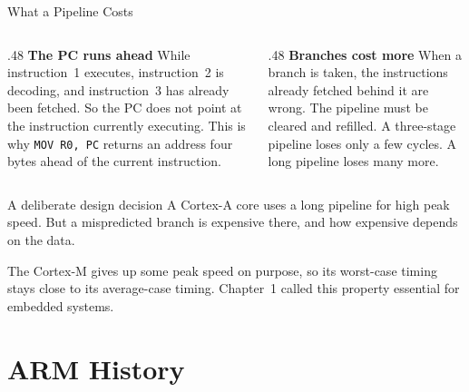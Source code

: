 \documentclass[9pt,aspectratio=169,xcolor=table]{beamer}
\begin{document}
\begin{frame}{What a Pipeline Costs}
    \begin{columns}[T]
    \begin{column}{.48\textwidth}
        \textbf{The PC runs ahead}
        \vspace{1mm}
        {\small While instruction~1 executes, instruction~2 is decoding, and instruction~3 has already been fetched. So the PC does not point at the instruction currently executing.}
        \vspace{2mm}
        {\small This is why \texttt{MOV R0, PC} returns an address four bytes ahead of the current instruction.}
    \end{column}
    \begin{column}{.48\textwidth}
        \textbf{Branches cost more}
        \vspace{1mm}
        {\small When a branch is taken, the instructions already fetched behind it are wrong. The pipeline must be cleared and refilled.}
        \vspace{2mm}
        {\small A three-stage pipeline loses only a few cycles. A long pipeline loses many more.}
    \end{column}
    \end{columns}
    \vspace{3mm}
    \begin{block}{A deliberate design decision}
        A Cortex-A core uses a long pipeline for high peak speed. But a mispredicted branch is expensive there, and how expensive depends on the data.

        The Cortex-M gives up some peak speed on purpose, so its worst-case timing stays close to its average-case timing. Chapter~1 called this property essential for embedded systems.
    \end{block}
\end{frame}


\section{ARM History}
\end{document}

